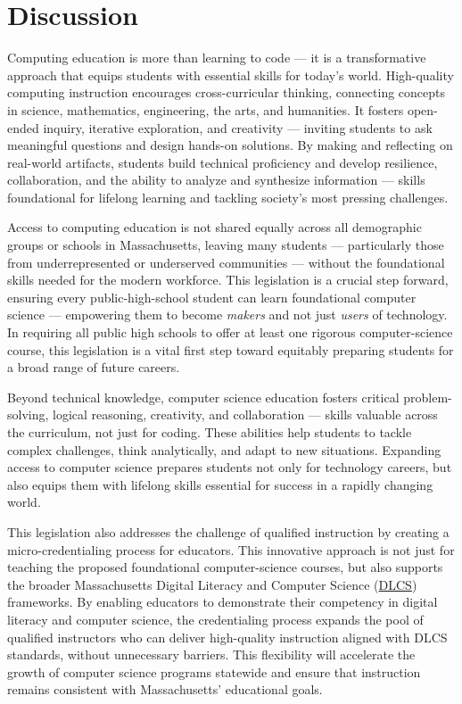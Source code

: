 \documentclass[12pt]{article}%
\begin{document}
\section{Discussion}
\label{Discussion}

Computing education is more than learning to code --- it is a transformative approach that equips students with essential skills for today's world. High-quality computing instruction encourages cross-curricular thinking, connecting concepts in science, mathematics, engineering, the arts, and humanities. It fosters open-ended inquiry, iterative exploration, and creativity --- inviting students to ask meaningful questions and design hands-on solutions. By making and reflecting on real-world artifacts, students build technical proficiency and develop resilience, collaboration, and the ability to analyze and synthesize information --- skills foundational for lifelong learning and tackling society's most pressing challenges.

Access to computing education is not shared equally across all demographic groups or schools in Massachusetts, leaving many students --- particularly those from underrepresented or underserved communities --- without the foundational skills needed for the modern workforce. This legislation is a crucial step forward, ensuring every public-high-school student can learn foundational computer science --- empowering them to become \textit{makers} and not just \textit{users} of technology. In requiring all public high schools to offer at least one rigorous computer-science course, this legislation is a vital first step toward equitably preparing students for a broad range of future careers.

Beyond technical knowledge, computer science education fosters critical problem-solving, logical reasoning, creativity, and collaboration --- skills valuable across the curriculum, not just for coding. These abilities help students to tackle complex challenges, think analytically, and adapt to new situations. Expanding access to computer science prepares students not only for technology careers, but also equips them with lifelong skills essential for success in a rapidly changing world.

This legislation also addresses the challenge of qualified instruction by creating a micro-credentialing process for educators. This innovative approach is not just for teaching the proposed foundational computer-science courses, but also supports the broader Massachusetts Digital Literacy and Computer Science (\href{https://www.doe.mass.edu/frameworks/dlcs.pdf}{DLCS}) frameworks. By enabling educators to demonstrate their competency in digital literacy and computer science, the credentialing process expands the pool of qualified instructors who can deliver high-quality instruction aligned with DLCS standards, without unnecessary barriers. This flexibility will accelerate the growth of computer science programs statewide and ensure that instruction remains consistent with Massachusetts' educational goals.
\end{document}
